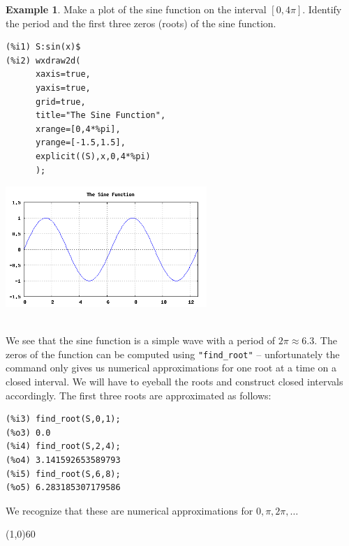\documentclass[10.5pt,twoside]{report}
\theoremstyle{definition}
\newtheorem{exmp}{Example}[section]
\begin{document}
\begin{exmp}
Make a plot of the sine function on the interval $[0,4\pi]$.  Identify the period and the first three zeros (roots) of the sine function.\\

\begin{verbatim}
(%i1) S:sin(x)$
(%i2) wxdraw2d(
      xaxis=true,
      yaxis=true,
      grid=true,
      title="The Sine Function",
      xrange=[0,4*%pi],
      yrange=[-1.5,1.5],
      explicit((S),x,0,4*%pi)
      );
\end{verbatim}

\includegraphics[width=3in]{example_1_2_1}

${}$\\

We see that the sine function is a simple wave with a period of $2\pi\approx6.3$.  The zeros of the function can be computed using \verb|"find_root"| -- unfortunately the command only gives us numerical approximations for one root at a time on a closed interval. We will have to eyeball the roots and construct closed intervals accordingly.  The first three roots are approximated as follows:

\begin{verbatim}
(%i3) find_root(S,0,1);
(%o3) 0.0
(%i4) find_root(S,2,4);
(%o4) 3.141592653589793
(%i5) find_root(S,6,8);
(%o5) 6.283185307179586
\end{verbatim}

We recognize that these are numerical approximations for ${0},{\pi},{2\pi},{\dots}$



\end{exmp}

\line(1,0){60}
\linethickness{0.5mm}
\end{document}
